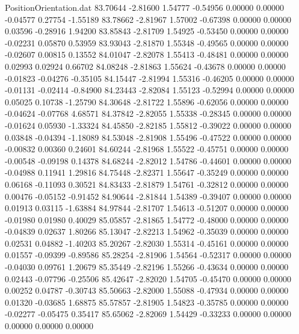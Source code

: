 \begin{filecontents}{PositionOrientation.dat}
  83.70644   -2.81600    1.54777    -0.54956    0.00000    0.00000   -0.04577    0.27754   -1.55189
  83.78662   -2.81967    1.57002    -0.67398    0.00000    0.00000    0.03596   -0.28916    1.94200
  83.85843   -2.81709    1.54925    -0.53450    0.00000    0.00000   -0.02231    0.05870    0.53959
  83.93043   -2.81870    1.55348    -0.49565    0.00000    0.00000   -0.02607    0.00815    0.13552
  84.01047   -2.82078    1.55413    -0.48481    0.00000    0.00000    0.02993    0.02924    0.66702
  84.08248   -2.81863    1.55624    -0.43678    0.00000    0.00000   -0.01823   -0.04276   -0.35105
  84.15447   -2.81994    1.55316    -0.46205    0.00000    0.00000   -0.01131   -0.02414   -0.84900
  84.23443   -2.82084    1.55123    -0.52994    0.00000    0.00000    0.05025    0.10738   -1.25790
  84.30648   -2.81722    1.55896    -0.62056    0.00000    0.00000   -0.04624   -0.07768    4.68571
  84.37842   -2.82055    1.55338    -0.28345    0.00000    0.00000   -0.01624    0.05930   -1.33324
  84.45850   -2.82185    1.55812    -0.39022    0.00000    0.00000    0.03848   -0.04394   -1.18089
  84.53048   -2.81908    1.55496    -0.47522    0.00000    0.00000   -0.00832    0.00360    0.24601
  84.60244   -2.81968    1.55522    -0.45751    0.00000    0.00000   -0.00548   -0.09198    0.14378
  84.68244   -2.82012    1.54786    -0.44601    0.00000    0.00000   -0.04988    0.11941    1.29816
  84.75448   -2.82371    1.55647    -0.35249    0.00000    0.00000    0.06168   -0.11093    0.30521
  84.83433   -2.81879    1.54761    -0.32812    0.00000    0.00000    0.00476   -0.05152   -0.91452
  84.90644   -2.81844    1.54389    -0.39407    0.00000    0.00000    0.01913    0.03115   -1.63884
  84.97844   -2.81707    1.54613    -0.51207    0.00000    0.00000   -0.01980    0.01980    0.40029
  85.05857   -2.81865    1.54772    -0.48000    0.00000    0.00000   -0.04839    0.02637    1.80266
  85.13047   -2.82213    1.54962    -0.35039    0.00000    0.00000    0.02531    0.04882   -1.40203
  85.20267   -2.82030    1.55314    -0.45161    0.00000    0.00000    0.01557   -0.09399   -0.89586
  85.28254   -2.81906    1.54564    -0.52317    0.00000    0.00000   -0.04030    0.09761    1.20679
  85.35449   -2.82196    1.55266    -0.43634    0.00000    0.00000    0.02443   -0.07796   -0.25506
  85.42647   -2.82020    1.54705    -0.45470    0.00000    0.00000    0.00252    0.04787   -0.30743
  85.50663   -2.82000    1.55088    -0.47934    0.00000    0.00000    0.01320   -0.03685    1.68875
  85.57857   -2.81905    1.54823    -0.35785    0.00000    0.00000   -0.02277   -0.05475    0.35417
  85.65062   -2.82069    1.54429    -0.33233    0.00000    0.00000    0.00000    0.00000    0.00000
\end{filecontents}
